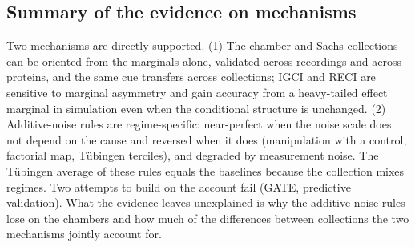 \subsection{Summary of the evidence on mechanisms}
Two mechanisms are directly supported. (1) The chamber and Sachs collections can be oriented from the marginals alone, validated across recordings and across proteins, and the same cue transfers across collections; IGCI and RECI are sensitive to marginal asymmetry and gain accuracy from a heavy-tailed effect marginal in simulation even when the conditional structure is unchanged. (2) Additive-noise rules are regime-specific: near-perfect when the noise scale does not depend on the cause and reversed when it does (manipulation with a control, factorial map, T\"ubingen terciles), and degraded by measurement noise. The T\"ubingen average of these rules equals the baselines because the collection mixes regimes. Two attempts to build on the account fail (GATE, predictive validation). What the evidence leaves unexplained is why the additive-noise rules lose on the chambers and how much of the differences between collections the two mechanisms jointly account for.
